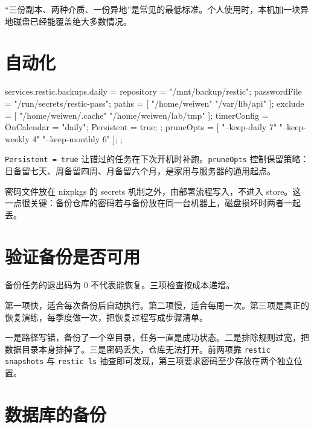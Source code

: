 “三份副本、两种介质、一份异地”是常见的最低标准。个人使用时，本机加一块异地磁盘已经能覆盖绝大多数情况。

\section{自动化}

\begin{nixcode}
services.restic.backups.daily = {
  repository = "/mnt/backup/restic";
  passwordFile = "/run/secrets/restic-pass";
  paths = [ "/home/weiwen" "/var/lib/api" ];
  exclude = [ "/home/weiwen/.cache" "/home/weiwen/lab/tmp" ];
  timerConfig = {
    OnCalendar = "daily";
    Persistent = true;
  };
  pruneOpts = [
    "--keep-daily 7"
    "--keep-weekly 4"
    "--keep-monthly 6"
  ];
};
\end{nixcode}

\texttt{Persistent = true} 让错过的任务在下次开机时补跑。\texttt{pruneOpts} 控制保留策略：日备留七天、周备留四周、月备留六个月，是家用与服务器的通用起点。

密码文件放在 nixpkgs 的 secrets 机制之外，由部署流程写入，不进入 store。这一点很关键：备份仓库的密码若与备份放在同一台机器上，磁盘损坏时两者一起丢。

\section{验证备份是否可用}

备份任务的退出码为 0 不代表能恢复。三项检查按成本递增。


第一项快，适合每次备份后自动执行。第二项慢，适合每周一次。第三项是真正的恢复演练，每季度做一次，把恢复过程写成步骤清单。

\begin{warnbox}[备份的三个常见失败]
一是路径写错，备份了一个空目录，任务一直是成功状态。二是排除规则过宽，把数据目录本身排掉了。三是密码丢失，仓库无法打开。前两项靠 \texttt{restic snapshots} 与 \texttt{restic ls} 抽查即可发现，第三项要求密码至少存放在两个独立位置。
\end{warnbox}

\section{数据库的备份}

